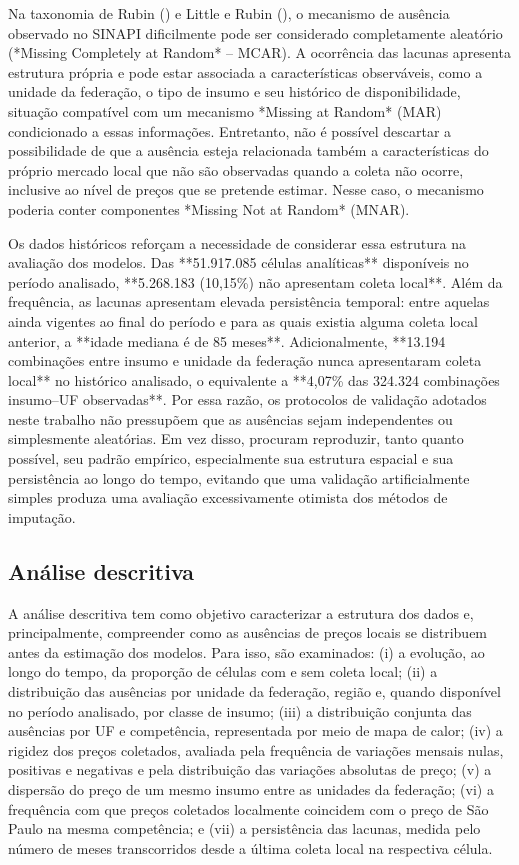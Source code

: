 Na taxonomia de Rubin () e Little e Rubin (), o mecanismo de ausência observado 
no SINAPI dificilmente pode ser considerado completamente aleatório 
(*Missing Completely at Random* -- MCAR). A ocorrência das lacunas apresenta estrutura 
própria e pode estar associada a características observáveis, como a unidade da federação, 
o tipo de insumo e seu histórico de disponibilidade, situação compatível com um 
mecanismo *Missing at Random* (MAR) condicionado a essas informações. Entretanto, 
não é possível descartar a possibilidade de que a ausência esteja relacionada também a 
características do próprio mercado local que não são observadas quando a coleta não 
ocorre, inclusive ao nível de preços que se pretende estimar. Nesse caso, o mecanismo 
poderia conter componentes *Missing Not at Random* (MNAR).

Os dados históricos reforçam a necessidade de considerar essa estrutura na avaliação 
dos modelos. Das **51.917.085 células analíticas** disponíveis no período analisado, 
**5.268.183 (10,15\%) não apresentam coleta local**. Além da frequência, as lacunas 
apresentam elevada persistência temporal: entre aquelas ainda vigentes ao final do 
período e para as quais existia alguma coleta local anterior, a **idade mediana é de 85 
meses**. Adicionalmente, **13.194 combinações entre insumo e unidade da federação nunca 
apresentaram coleta local** no histórico analisado, o equivalente a **4,07\% das 324.324 
combinações insumo--UF observadas**. Por essa razão, os protocolos de validação adotados 
neste trabalho não pressupõem que as ausências sejam independentes ou simplesmente 
aleatórias. Em vez disso, procuram reproduzir, tanto quanto possível, seu padrão empírico, 
especialmente sua estrutura espacial e sua persistência ao longo do tempo, evitando que 
uma validação artificialmente simples produza uma avaliação excessivamente otimista dos 
métodos de imputação.

\subsection{Análise descritiva}

A análise descritiva tem como objetivo caracterizar a estrutura dos dados e, 
principalmente, compreender como as ausências de preços locais se distribuem antes 
da estimação dos modelos. Para isso, são examinados: (i) a evolução, ao longo do tempo, 
da proporção de células com e sem coleta local; (ii) a distribuição das ausências por 
unidade da federação, região e, quando disponível no período analisado, por classe de 
insumo; (iii) a distribuição conjunta das ausências por UF e competência, representada 
por meio de mapa de calor; (iv) a rigidez dos preços coletados, avaliada pela frequência 
de variações mensais nulas, positivas e negativas e pela distribuição das variações 
absolutas de preço; (v) a dispersão do preço de um mesmo insumo entre as unidades da 
federação; (vi) a frequência com que preços coletados localmente coincidem com o preço 
de São Paulo na mesma competência; e (vii) a persistência das lacunas, medida pelo 
número de meses transcorridos desde a última coleta local na respectiva célula.

